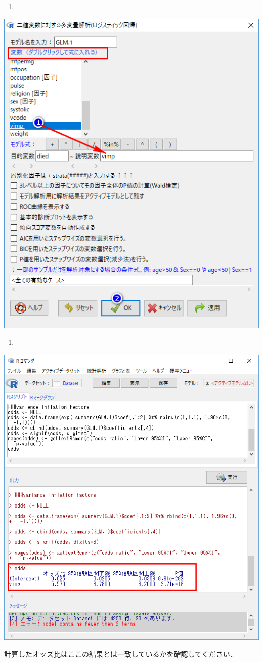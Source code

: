 \documentclass[11pt,]{problemset}
\begin{document}
\begin{enumerate}
\def\labelenumi{\arabic{enumi}.}
\setcounter{enumi}{7}
\item
\end{enumerate}

\begin{center}\includegraphics[width=0.5\linewidth]{pic/logstic07} \end{center}

\newpage
\vfill

\begin{enumerate}
\def\labelenumi{\arabic{enumi}.}
\setcounter{enumi}{8}
\item
\end{enumerate}

\begin{center}\includegraphics[width=0.55\linewidth]{pic/logstic08} \end{center}

計算したオッズ比はここの結果とは一致しているかを確認してください．
\end{document}

